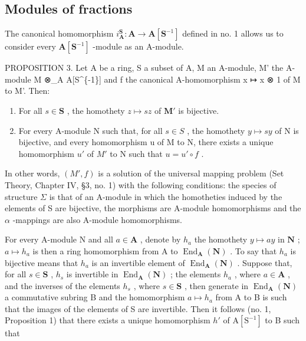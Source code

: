 \subsection{Modules of fractions}

The canonical homomorphism \(i_{\mathbf{A}}^{\mathbf{S}} \colon \mathbf{A} \to \mathbf{A}[\mathbf{S}^{-1}]\) defined in no. 1 allows us to consider every \(\mathbf{A}[\mathbf{S}^{-1}]\) -module as an A-module.

PROPOSITION 3. Let A be a ring, S a subset of A, M an A-module, M' the A-module M ⊗\_A A{[}S\^{}\{-1\}{]} and f the canonical A-homomorphism x ↦ x ⊗ 1 of M to M'. Then:

\begin{enumerate}
\def\labelenumi{(\arabic{enumi})}
\item
  For all \(s \in \mathbf{S}\) , the homothety \(z \mapsto sz\) of \(\mathbf{M}'\) is bijective.
\item
  For every A-module N such that, for all \(s \in S\) , the homothety \(y \mapsto sy\) of N is bijective, and every homomorphism u of M to N, there exists a unique homomorphism \(u'\) of \(M'\) to N such that \(u = u' \circ f\) .
\end{enumerate}

In other words, \((M',f)\) is a solution of the universal mapping problem (Set Theory, Chapter IV, §3, no. 1) with the following conditions: the species of structure \(\Sigma\) is that of an A-module in which the homotheties induced by the elements of S are bijective, the morphisms are A-module homomorphisms and the \(\alpha\) -mappings are also A-module homomorphisms.

For every A-module N and all \(a \in \mathbf{A}\) , denote by \(h_a\) the homothety \(y \mapsto ay\) in \(\mathbf{N}\) ; \(a \mapsto h_a\) is then a ring homomorphism from A to \(\operatorname{End}_{\mathbf{A}}(\mathbf{N})\) . To say that \(h_a\) is bijective means that \(h_a\) is an invertible element of \(\operatorname{End}_{\mathbf{A}}(\mathbf{N})\) . Suppose that, for all \(s \in \mathbf{S}\) , \(h_s\) is invertible in \(\operatorname{End}_{\mathbf{A}}(\mathbf{N})\) ; the elements \(h_a\) , where \(a \in \mathbf{A}\) , and the inverses of the elements \(h_s\) , where \(s \in \mathbf{S}\) , then generate in \(\operatorname{End}_{\mathbf{A}}(\mathbf{N})\) a commutative subring B and the homomorphism \(a \mapsto h_a\) from A to B is such that the images of the elements of S are invertible. Then it follows (no. 1, Proposition 1) that there exists a unique homomorphism \(h'\) of \(\mathrm{A}[\mathrm{S}^{-1}]\) to B such that

